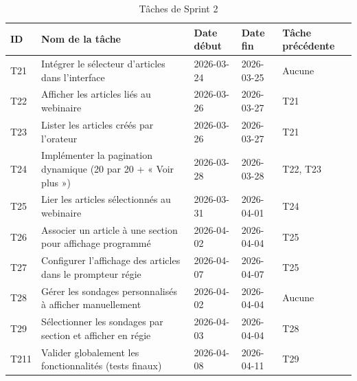 \begin{table}[!htbp]
    \centering
    \caption{Tâches de Sprint 2}
    \begin{tabular}{p{1.2cm} p{6.5cm} p{2.2cm} p{2.2cm} p{2.0cm}}
        \toprule
        ID   & Nom de la tâche & Date début & Date fin & Tâche précédente \\
        \midrule
        T21  & Intégrer le sélecteur d'articles dans l'interface               & 2026-03-24 & 2026-03-25 & Aucune \\
        T22  & Afficher les articles liés au webinaire                         & 2026-03-26 & 2026-03-27 & T21 \\
        T23  & Lister les articles créés par l'orateur                         & 2026-03-26 & 2026-03-27 & T21 \\
        T24  & Implémenter la pagination dynamique (20 par 20 + « Voir plus ») & 2026-03-28 & 2026-03-28 & T22, T23 \\
        T25  & Lier les articles sélectionnés au webinaire                     & 2026-03-31 & 2026-04-01 & T24 \\
        T26  & Associer un article à une section pour affichage programmé      & 2026-04-02 & 2026-04-04 & T25 \\
        T27  & Configurer l'affichage des articles dans le prompteur régie      & 2026-04-07 & 2026-04-07 & T25 \\
        T28  & Gérer les sondages personnalisés à afficher manuellement        & 2026-04-02 & 2026-04-04 & Aucune \\
        T29  & Sélectionner les sondages par section et afficher en régie      & 2026-04-03 & 2026-04-04 & T28 \\
        T211 & Valider globalement les fonctionnalités (tests finaux)          & 2026-04-08 & 2026-04-11 & T29 \\
        \bottomrule
    \end{tabular}
    \label{tab:sprint2}
\end{table}

